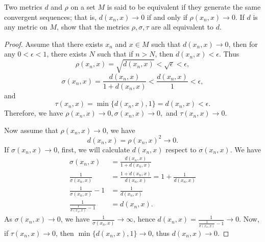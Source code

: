 \documentclass[12pt, a4paper]{article}
\theoremstyle{plain}
\begin{document}
\begin{exercise}{42}
Two metrics $d$ and $\rho$ on a set $M$ is said to be equivalent if they generate the same convergent sequences; that is, $d(x_n,x)\rightarrow 0$ if and only if $\rho(x_n,x)\rightarrow 0$. If $d$ is any metric on $M$, show that the metrics $\rho,\sigma,\tau$ are all equivalent to $d$.
\end{exercise}
	\begin{proof}
	Assume that there exists $x_n$ and $x\in M$ such that $d(x_n,x)\rightarrow 0$, then for any $0<\epsilon<1$, there exists $N$ such that if $n>N$, then $d(x_n,x)<\epsilon$. Thus 
	\[
	\rho(x_n,x)=\sqrt{d(x_n,x)}<\sqrt{\epsilon}<\epsilon,
	\]
	\[
	\sigma(x_n,x)=\frac{d(x_n,x)}{1+d(x_n,x)}<\frac{d(x_n,x)}{1}<\epsilon,
	\]
	and
	\[
	\tau(x_n,x)=\min\{d(x_n,x),1\}=d(x_n,x)<\epsilon.
	\]
	Therefore, we have $\rho(x_n,x)\rightarrow 0,\sigma(x_n,x)\rightarrow 0,$ and $\tau(x_n,x)\rightarrow 0$. 
	
	Now assume that $\rho(x_n,x)\rightarrow 0$, we have 
	\[
	d(x_n,x)=\rho(x_n,x)^2\rightarrow 0.
	\]
	If $\sigma(x_n,x)\rightarrow 0$, first, we will calculate $d(x_n,x)$ respect to $\sigma(x_n,x)$. We have
	\begin{align*}
	\sigma(x_n,x)&=\frac{d(x_n,x)}{1+d(x_n,x)}\\
	\frac{1}{\sigma(x_n,x)}&=\frac{1+d(x_n,x)}{d(x_n,x)}=1+\frac{1}{d(x_n,x)}\\
	\frac{1}{\sigma(x_n,x)}-1&=\frac{1}{d(x_n,x)}\\
	\frac{1}{\frac{1}{\sigma(x_x,x)}-1}&=d(x_n,x).
	\end{align*}
	As $\sigma(x_n,x)\rightarrow 0$, we have $\frac{1}{\sigma(x_n,x)}\rightarrow \infty$, hence $d(x_n,x)=\frac{1}{\frac{1}{\sigma(x_x,x)}-1}\rightarrow 0$. Now, if $\tau(x_n,x)\rightarrow 0$, then $\min\{d(x_n,x),1\}\rightarrow 0$, thus $d(x_n,x)\rightarrow 0$.
	\end{proof}
\end{document}

